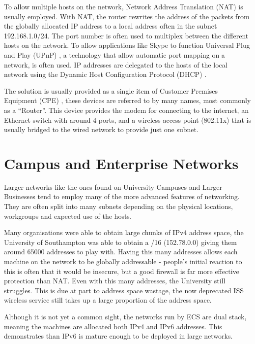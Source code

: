 \documentclass[12pt]{report}
\begin{document}
To allow multiple hosts on the network, Network Address Translation (NAT)
 is usually employed. With
NAT, the router rewrites the address of the packets from the globally
allocated IP address to a local address often in the subnet 192.168.1.0/24.
The port number is often used to multiplex between the different hosts on the
network. To allow applications like Skype to function Universal Plug and Play
(UPnP) , a technology that allow
automatic port mapping on a network, is often used. IP addresses are
delegated to the hosts of the local network using the Dynamic Host
Configuration Protocol (DHCP) . 

The solution is usually provided as a single item of Customer Premises
Equipment (CPE) , these devices
are referred to by many names, most commonly as a ``Router''.  This device
provides the modem for connecting to the internet, an Ethernet switch with
around 4 ports, and a wireless access point (802.11x) that is usually bridged
to the wired network to provide just one subnet. 

\section{Campus and Enterprise Networks}
Larger networks like the ones found on University Campuses and Larger
Businesses tend to employ many of the more advanced features of networking.
They are often split into many subnets depending on the physical locations,
workgroups and expected use of the hosts. 

Many organisations were able to obtain large chunks of IPv4 address space, the
University of Southampton was able to obtain a /16 (152.78.0.0) giving them
around 65000 addresses to play with. Having this many addresses allows each
machine on the network to be globally addressable - people's initial reaction
to this is often that it would be insecure, but a good firewall is far more
effective protection than NAT\@. Even with this many addresses, the University
still struggles. This is due at part to address space wastage, the now
deprecated ISS wireless service still takes up a large proportion of the
address space.

Although it is not yet a common sight, the networks run by ECS are dual stack,
meaning the machines are allocated both IPv4 and IPv6 addresses. This
demonstrates than IPv6 is mature enough to be deployed in large networks.
\end{document}
